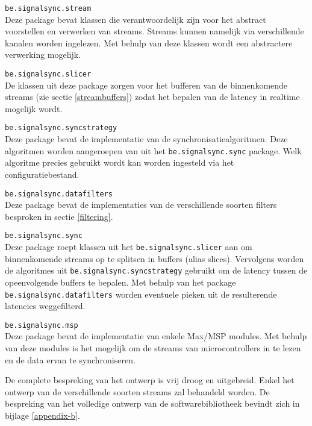 \begin{description}	
	\item\texttt{be.signalsync.stream} \hfill \\
	Deze package bevat klassen die verantwoordelijk zijn voor het abstract voorstellen en verwerken van streams. Streams kunnen namelijk via verschillende kanalen worden ingelezen. Met behulp van deze klassen wordt een abstractere verwerking mogelijk.
	
	\item\texttt{be.signalsync.slicer} \hfill \\
	De klassen uit deze package zorgen voor het bufferen van de binnenkomende streams (zie sectie \ref{streambuffers}) zodat het bepalen van de latency in realtime mogelijk wordt. 

	\item\texttt{be.signalsync.syncstrategy} \hfill \\
	Deze package bevat de implementatie van de synchronisatiealgoritmen. Deze algoritmen worden aangeroepen van uit het \texttt{be.signalsync.sync} package. Welk algoritme precies gebruikt wordt kan worden ingesteld via het configuratiebestand.
	
	\item\texttt{be.signalsync.datafilters} \hfill \\
	Deze package bevat de implementaties van de verschillende soorten filters besproken in sectie \ref{filtering}.
	
	\item\texttt{be.signalsync.sync} \hfill \\
	Deze package roept klassen uit het \texttt{be.signalsync.slicer} aan om binnenkomende streams op te splitsen in buffers (alias slices). Vervolgens worden de algoritmes uit \texttt{be.signalsync.syncstrategy} gebruikt om de latency tussen de opeenvolgende buffers te bepalen. Met behulp van het package \texttt{be.signalsync.datafilters} worden eventuele pieken uit de resulterende latencies weggefilterd.

	\item\texttt{be.signalsync.msp} \hfill \\
	Deze package bevat de implementatie van enkele Max/MSP modules. Met behulp van deze modules is het mogelijk om de streams van microcontrollers in te lezen en de data ervan te synchroniseren.
	
\end{description}

De complete bespreking van het ontwerp is vrij droog en uitgebreid. Enkel het ontwerp van de verschillende soorten streams zal behandeld worden. De bespreking van het volledige ontwerp van de softwarebibliotheek bevindt zich in bijlage \ref{appendix-b}.

